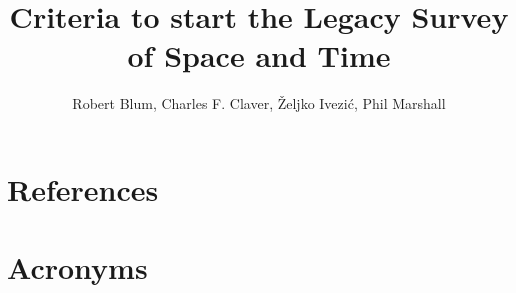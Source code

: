 \documentclass[OPS,lsstdraft,authoryear,toc]{lsstdoc}
\title{Criteria to start the Legacy Survey of Space and Time}
\author{%
Robert Blum, Charles F. Claver, \v{Z}eljko Ivezi\'{c}, Phil Marshall
}
\date{\vcsDate}
\begin{document}
\maketitle









\section{References} \label{sec:bib}

\renewcommand{\refname}{} %


\section{Acronyms} \label{sec:acronyms}

\end{document}
